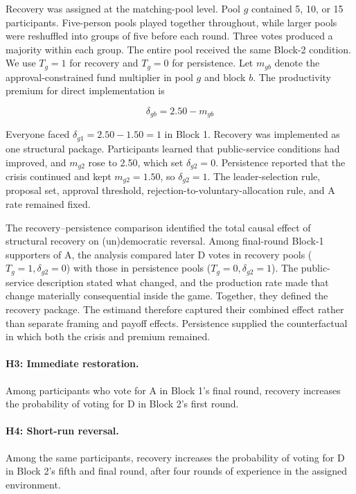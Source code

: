 \documentclass[11pt]{article}
\newcommand{\Dproc}{\textsf{D}}
\newcommand{\Aproc}{\textsf{A}}
\begin{document}
Recovery was assigned at the matching-pool level. Pool \(g\) contained 5, 10, or 15 participants. Five-person pools played together throughout, while larger pools were reshuffled into groups of five before each round. Three votes produced a majority within each group. The entire pool received the same Block-2 condition. We use \(T_g=1\) for recovery and \(T_g=0\) for persistence. Let \(m_{gb}\) denote the approval-constrained fund multiplier in pool \(g\) and block \(b\). The productivity premium for direct implementation is

\begin{equation}
\delta_{gb}=2.50-m_{gb}
\label{eq:productivity-premium}
\end{equation}

Everyone faced \(\delta_{g1}=2.50-1.50=1\) in Block 1. Recovery was implemented as one structural package. Participants learned that public-service conditions had improved, and \(m_{g2}\) rose to 2.50, which set \(\delta_{g2}=0\). Persistence reported that the crisis continued and kept \(m_{g2}=1.50\), so \(\delta_{g2}=1\). The leader-selection rule, proposal set, approval threshold, rejection-to-voluntary-allocation rule, and \Aproc{} rate remained fixed.

The recovery--persistence comparison identified the total causal effect of structural recovery on (un)democratic reversal. Among final-round Block-1 supporters of \Aproc{}, the analysis compared later \Dproc{} votes in recovery pools (\(T_g=1,\delta_{g2}=0\)) with those in persistence pools (\(T_g=0,\delta_{g2}=1\)). The public-service description stated what changed, and the production rate made that change materially consequential inside the game. Together, they defined the recovery package. The estimand therefore captured their combined effect rather than separate framing and payoff effects. Persistence supplied the counterfactual in which both the crisis and premium remained.



\paragraph{H3: Immediate restoration.} Among participants who vote for \Aproc{} in Block 1's final round, recovery increases the probability of voting for \Dproc{} in Block 2's first round.

\paragraph{H4: Short-run reversal.} Among the same participants, recovery increases the probability of voting for \Dproc{} in Block 2's fifth and final round, after four rounds of experience in the assigned environment.
\end{document}
